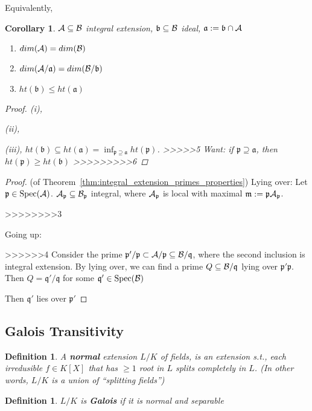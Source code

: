 \documentclass[11pt]{article}
\newtheorem{cor}[thm]{Corollary}
\newtheorem{dfn}[thm]{Definition}
\newcommand{\sca}{{\mathfrak a}}
\newcommand{\scb}{{\mathfrak b}}
\newcommand{\scm}{{\mathfrak m}}
\newcommand{\scp}{{\mathfrak p}}
\newcommand{\scq}{\mathfrak q}
\newcommand{\cala}{{\cal A}}
\newcommand{\calb}{{\cal B}}
\begin{document}
Equivalently,

\begin{cor}
$\cala\subseteq\calb$ integral extension, $\scb\subseteq\calb$ ideal, $\sca:=\scb\cap\cala$
\begin{enumerate}
\item $dim(\cala)=dim(\calb)$
\item $dim(\cala/\sca)= dim(\calb/\scb)$
\item $ht(\scb)\leq ht(\sca)$
\end{enumerate}
\begin{proof}
(i),

(ii),


(iii), $ht(\scb)\subseteq ht(\sca)=\inf_{\scp\supseteq \sca} ht(\scp)$. 
>>>>>5
Want: if $\scp\supseteq \sca$, then $ht(\scp)\geq ht(\scb)$
>>>>>>>>>6
\end{proof}
\end{cor}

\begin{proof}(of Theorem~\ref{thm:integral_extension_primes_properties})
Lying over: Let $\scp\in \text{Spec}(\cala)$. $\cala_\scp\subseteq\calb_\scp$ integral, where $\cala_\scp$ is local with maximal $\scm:=\scp\cala_\scp$.

>>>>>>>>3


Going up:

>>>>>>4
Consider the prime $\scp'/\scp\subset\cala/\scp\subseteq\calb/\scq$, where the second inclusion is integral extension. By lying over, we can find a prime $Q\subseteq\calb/\scq$ lying over $\scp'\scp$. Then $Q=\scq'/\scq$ for some $\scq'\in \text{Spec}(\calb)$

Then $\scq'$ lies over $\scp'$
\end{proof}


\subsection*{Galois Transitivity}

\begin{dfn}
A \textbf{normal} extension $L/K$ of fields, is an extension s.t., each irredusible $f\in K[X]$ that has $\geq 1$ root in $L$ splits completely in $L$. (In other words, $L/K$ is  a union of ``splitting fields'')
\end{dfn}

\begin{dfn}
$L/K$ is \textbf{Galois} if it is normal and separable
\end{dfn}
\end{document}
